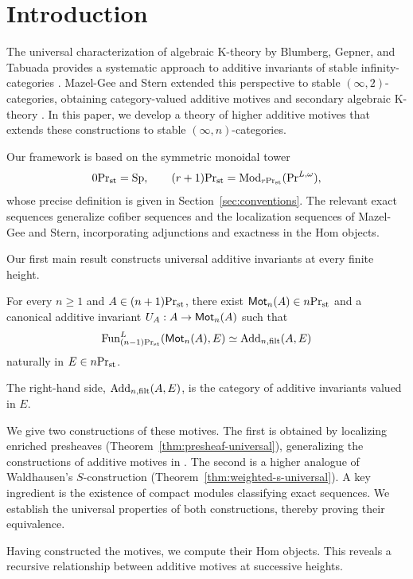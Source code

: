 
\section{Introduction}

The universal characterization of algebraic K-theory by
Blumberg, Gepner, and Tabuada provides a systematic approach
to additive invariants of stable infinity-categories
\citep{BGT}. Mazel-Gee and Stern extended this perspective
to stable $(\infty,2)$-categories, obtaining category-valued
additive motives and secondary algebraic K-theory \citep{MGS}.
In this paper, we develop a theory of higher additive motives
that extends these constructions to stable $(\infty,n)$-categories.

Our framework is based on the symmetric monoidal tower
\[
 {0}\mathrm{Pr}_{\mathrm{st}}=\mathrm{Sp},\qquad
 {(r+1)}\mathrm{Pr}_{\mathrm{st}}=\operatorname{Mod}_{{r}\mathrm{Pr}_{\mathrm{st}}}(\mathrm{Pr}^{L,\omega}),
\]
whose precise definition is given in
Section~\ref{sec:conventions}.
The relevant exact sequences generalize cofiber sequences
and the localization sequences of Mazel-Gee and Stern,
incorporating adjunctions and exactness in the Hom objects.

Our first main result constructs universal additive
invariants at every finite height.

\begin{theorem}
\label{thm:main}
For every $n\geq1$ and $A\in{(n+1)}\mathrm{Pr}_{\mathrm{st}}$,
there exist $\mathsf{Mot}_n(A)\in{n}\mathrm{Pr}_{\mathrm{st}}$ and a canonical
additive invariant $U_A:A\to \mathsf{Mot}_n(A)$ such that
\begin{equation}\label{eq:main-up}
 \operatorname{Fun}^L_{{(n-1)}\mathrm{Pr}_{\mathrm{st}}}(\mathsf{Mot}_n(A),E)
 \simeq \operatorname{Add}_{n,\mathrm{filt}}(A,E)
\end{equation}
naturally in $E\in{n}\mathrm{Pr}_{\mathrm{st}}$.
\end{theorem}

The right-hand side, $\operatorname{Add}_{n,\mathrm{filt}}(A,E)$, is the category of additive invariants valued in $E$.

We give two constructions of these motives.
The first is obtained by localizing enriched presheaves
(Theorem~\ref{thm:presheaf-universal}),
generalizing the constructions of additive motives in
\cite{BGT,MGS}. The second is a higher analogue of
Waldhausen's $S$-construction
(Theorem~\ref{thm:weighted-s-universal}).
A key ingredient is the existence of compact modules
classifying exact sequences.
We establish the universal properties of both constructions,
thereby proving their equivalence.

Having constructed the motives, we compute their Hom objects.
This reveals a recursive relationship between additive motives
at successive heights.

